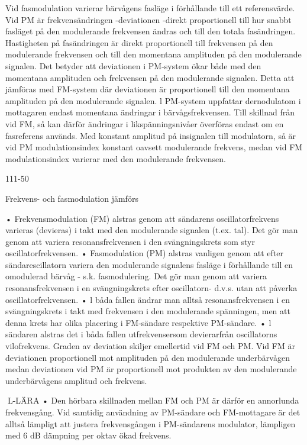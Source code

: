 Vid fasmodulation varierar bärvågens fasläge i förhållande till ett referensvärde. Vid PM
är frekvensändringen -deviationen -direkt
proportionell till hur snabbt fasläget på den
modulerande frekvensen ändras och till den
totala fasändringen. Hastigheten på fasändringen är direkt proportionell till frekvensen
på den modulerande frekvensen och till den
momentana amplituden på den modulerande signalen.
Det betyder att deviationen i PM-system
ökar både med den momentana amplituden
och frekvensen på den modulerande signalen. Detta att jämföras med FM-system där
deviationen är proportionell till den momentana amplituden på den modulerande signalen.
l PM-system uppfattar dernodulatom i
mottagaren endast momentana ändringar i
bärvågsfrekvensen. Till skillnad från vid FM,
så kan därför ändringar i likspänningsnivåer
överföras endast om en fasreferens används.
Med konstant amplitud på insignalen till
modulatorn, så är vid PM modulationsindex
konstant oavsett modulerande frekvens,
medan vid FM modulationsindex varierar
med den modulerande frekvensen.

111-50

Frekvens- och fasmodulation jämförs

• Frekvensmodulation (FM) alstras genom
att sändarens oscillatorfrekvens varieras
(devieras) i takt med den modulerande
signalen (t.ex. tal). Det gör man genom att
variera resonansfrekvensen i den svängningskrets som styr oscillatorfrekvensen.
• Fasmodulation (PM) alstras vanligen genom att efter sändarescillatorn variera den
modulerande signalens fasläge i förhållande till en omodulerad bärvåg - s.k.
fasmodulering. Det gör man genom att
variera resonansfrekvensen i en svängningskrets efter oscillatorn- d.v.s. utan att
påverka oscillatorfrekvensen.
• l båda fallen ändrar man alltså resonansfrekvensen i en svängningskrets i takt med
frekvensen i den modulerande spänningen,
men att denna krets har olika placering i
FM-sändare respektive PM-sändare.
• l sändaren alstras det i båda fallen
utfrekvensersom devierarfrån oscillatorns
vilofrekvens. Graden av deviation skiljer
emellertid vid FM och PM. Vid FM är
deviationen proportionell mot amplituden
på den modulerande underbärvågen
medan deviationen vid PM är proportionell
mot produkten av den modulerande underbärvågens amplitud och frekvens.

L-LÄRA
• Den hörbara skillnaden mellan FM och PM
är därför en annorlunda frekvensgång.
Vid samtidig användning av PM-sändare
och FM-mottagare är det alltså lämpligt att
justera frekvensgången i PM-sändarens
modulator, lämpligen med 6 dB dämpning
per oktav ökad frekvens.

